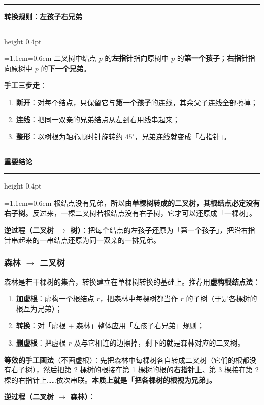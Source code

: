 \documentclass[11pt,openany,UTF8]{ctexbook}
\newcommand{\callouthead}[2]{%
  \par\addvspace{7pt}\noindent
  {\color{#1}\rule[-0.15em]{3pt}{1.05em}}\hspace{0.5em}%
  {\bfseries\color{#1}#2}\par\nobreak\vspace{-0.35em}%
  {\color{rulesep}\hrule height 0.4pt}\nobreak\vspace{0.45em}%
  \begingroup\small\setlength{\parindent}{0pt}%
  \leftskip=1.1em\rightskip=0.6em\noindent\ignorespaces}
\newcommand{\calloutend}{\par\endgroup\addvspace{7pt}}
\newenvironment{callkey}[1]{\callouthead{keybar}{#1}}{\calloutend}
\begin{document}
\begin{callkey}{转换规则：左孩子右兄弟}
二叉树中结点 $p$ 的\textbf{左指针}指向原树中 $p$ 的\textbf{第一个孩子}；\textbf{右指针}指向原树中 $p$ 的\textbf{下一个兄弟}。

\textbf{手工三步走}：

\begin{enumerate}
\item \textbf{断开}：对每个结点，只保留它与\textbf{第一个孩子}的连线，其余父子连线全部擦掉；
\item \textbf{连线}：把同一双亲的兄弟结点从左到右用线串起来；
\item \textbf{整形}：以树根为轴心顺时针旋转约 $45^\circ$，兄弟连线就变成「右指针」。
\end{enumerate}
\end{callkey}

\begin{callkey}{重要结论}
根结点没有兄弟，所以\textbf{由单棵树转成的二叉树，其根结点必定没有右子树}。反过来，一棵二叉树若根结点没有右子树，它才可以还原成「一棵树」。

\end{callkey}

\textbf{逆过程（二叉树 $\to$ 树）}：把每个结点的左孩子还原为「第一个孩子」，把沿右指针串起来的一串结点还原为同一双亲的一排兄弟。

\subsubsection{森林 $\to$ 二叉树}

森林是若干棵树的集合，转换建立在单棵树转换的基础上。推荐用\textbf{虚构根结点法}：

\begin{enumerate}
\item \textbf{加虚根}：虚构一个根结点 $r$，把森林中每棵树都当作 $r$ 的子树（于是各棵树的根互为兄弟）；
\item \textbf{转换}：对「虚根 + 森林」整体应用「左孩子右兄弟」规则；
\item \textbf{删虚根}：把虚根 $r$ 及与它相连的边擦掉，剩下的就是森林对应的二叉树。
\end{enumerate}
\textbf{等效的手工画法}（不画虚根）：先把森林中每棵树各自转成二叉树（它们的根都没有右子树），然后把第 2 棵树的根接在第 1 棵树的根的\textbf{右指针}上、第 3 棵接在第 2 棵的右指针上……依次串联。\textbf{本质上就是「把各棵树的根视为兄弟」。}

\textbf{逆过程（二叉树 $\to$ 森林）}：
\end{document}
